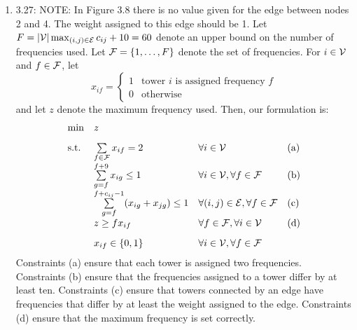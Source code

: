 \documentclass[10pt]{article}
\begin{document}
\begin{enumerate}

\item 3.27: NOTE:  In Figure 3.8 there is no value given for the edge between nodes 2 and 4.  The weight assigned to this edge should be 1.  Let $F = |{\cal V}| \max_{(i,j) \in {\cal E}} c_{ij} + 10 = 60$ denote an upper bound on the number of
  frequencies used. Let ${\cal F} = \{1,\ldots,F\}$ denote the set of
  frequencies. For $i \in {\cal V}$ and $f \in {\cal F}$, let
  \[
  x_{if} = \left\{
    \begin{array}{ll}
      1 & \mbox{tower $i$ is assigned frequency $f$} \\
      0 & \mbox{otherwise}
    \end{array}
  \right.
  \]
  and let $z$ denote the maximum frequency used.
  Then, our formulation is:
  \[
  \begin{array}{llll}
    \min & z & & \\[3mm]
    \mbox{s.t.} & \sum\limits_{f \in {\cal F}} x_{if} = 2 & \forall i \in {\cal V} &
    \mbox{(a)} \\[3mm]
    & \sum\limits_{g=f}^{f+9} x_{ig} \leq 1 & \forall i \in {\cal V}, \forall f
    \in {\cal F} & \mbox{(b)} \\[3mm]
    & \sum\limits_{g=f}^{f+c_{ij}-1} (x_{ig} + x_{jg}) \leq 1 & \forall (i,j)
    \in {\cal E}, \forall f \in {\cal F} & \mbox{(c)} \\[3mm]
    & z \geq f x_{if} & \forall f \in {\cal F}, \forall i \in {\cal V} &
    \mbox{(d)} \\[3mm]
    & x_{if} \in \{0,1\} & \forall i \in {\cal V}, \forall f \in {\cal F} &
  \end{array} 
  \]
  Constraints (a) ensure that each tower is assigned two
  frequencies. Constraints (b) ensure that the frequencies assigned to
  a tower differ by at least ten. Constraints (c) ensure that towers
  connected by an edge have frequencies that differ by at least the
  weight assigned to the edge. Constraints (d) ensure that the maximum
  frequency is set correctly.


\end{enumerate}
\end{document}
